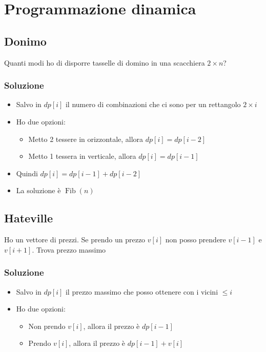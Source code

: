 \section{Programmazione dinamica}
\subsection{Donimo}
Quanti modi ho di disporre tasselle di domino in una scacchiera $ 2 \times n $?

\subsubsection{Soluzione}
\begin{itemize}
	\item Salvo in $ dp\left[i\right] $ il numero di combinazioni che ci sono per un rettangolo $ 2 \times i $
	\item Ho due opzioni:
	      \begin{itemize}
		      \item Metto 2 tessere in orizzontale, allora $ dp\left[i\right] = dp\left[i-2\right] $
		      \item Metto 1 tessera in verticale, allora $ dp\left[i\right] = dp\left[i-1\right] $
	      \end{itemize}
	\item Quindi $ dp\left[i\right] = dp\left[i-1\right] + dp\left[i-2\right] $
	\item La soluzione è $ \operatorname{Fib}\left(n\right) $
\end{itemize}
\subsection{Hateville}
Ho un vettore di prezzi. Se prendo un prezzo $ v\left[i\right] $ non posso prendere $ v\left[i-1\right] $ e $ v\left[i+1\right] $. Trova prezzo massimo

\subsubsection{Soluzione}
\begin{itemize}
	\item Salvo in $ dp\left[i\right] $ il prezzo massimo che posso ottenere con i vicini $ \le i $
	\item Ho due opzioni:
	      \begin{itemize}
		      \item Non prendo $ v\left[i\right] $, allora il prezzo è $ dp\left[i-1\right] $
		      \item Prendo $ v\left[i\right] $, allora il prezzo è $ dp\left[i-1\right] + v\left[i\right] $
	      \end{itemize}
\end{itemize}
